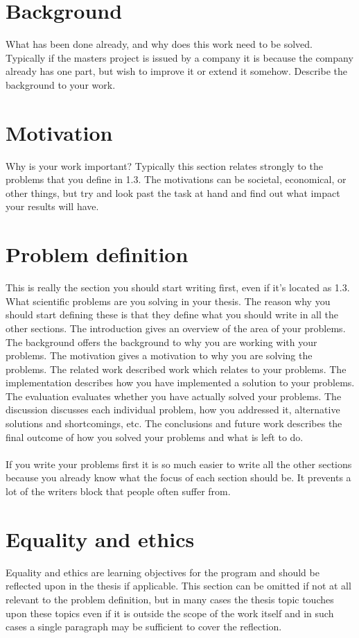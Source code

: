 \section{Background}
What has been done already, and why does this work need to be solved. Typically if the masters project is issued by a company it is because the company already has one part, but wish to improve it or extend it somehow. Describe the background to your work.
\section{Motivation}
Why is your work important? Typically this section relates strongly to the problems that you define in 1.3. The motivations can be societal, economical, or other things, but try and look past the task at hand and find out what impact your results will have.
\section{Problem definition}



This is really the section you should start writing first, even if it's located as 1.3. What scientific problems are you solving in your thesis. The reason why you should start defining these is that they define what you should write in all the other sections. The introduction gives an overview of the area of your problems. The background offers the background to why you are working with your problems. The motivation gives a motivation to why you are solving the problems. The related work described work which relates to your problems. The implementation describes how you have implemented a solution to your problems. The evaluation evaluates whether you have actually solved your problems. The discussion discusses each individual problem, how you addressed it, alternative solutions and shortcomings, etc. The conclusions and future work describes the final outcome of how you solved your problems and what is left to do.
\\ \\
If you write your problems first it is so much easier to write all the other sections because you already know what the focus of each section should be. It prevents a lot of the writers block that people often suffer from.
\section{Equality and ethics}
Equality and ethics are learning objectives for the program and should be reflected upon in the thesis if applicable. This section can be omitted if not at all relevant to the problem definition, but in many cases the thesis topic touches upon these topics even if it is outside the scope of the work itself and in such cases a single paragraph may be sufficient to cover the reflection.
